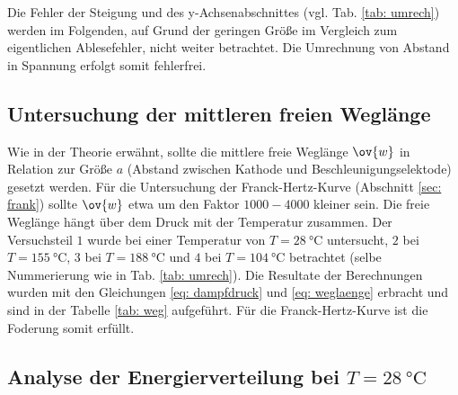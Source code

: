 Die Fehler der Steigung und des y-Achsenabschnittes (vgl. Tab. \ref{tab: umrech}) werden
im Folgenden, auf Grund der geringen Größe im Vergleich zum eigentlichen Ablesefehler, nicht weiter betrachtet.
Die Umrechnung von Abstand in Spannung erfolgt somit fehlerfrei.
\FloatBarrier

\subsection{Untersuchung der mittleren freien Weglänge}
\FloatBarrier
Wie in der Theorie erwähnt, sollte die mittlere freie Weglänge $\ov{w}$ in Relation zur Größe $a$
(Abstand zwischen Kathode und Beschleunigungselektode) gesetzt werden. Für die Untersuchung der Franck-Hertz-Kurve (Abschnitt \ref{sec: frank})
sollte $\ov{w}$ etwa um den Faktor $1000-4000$ kleiner sein. Die freie Weglänge hängt über dem Druck mit der Temperatur zusammen.
Der Versuchsteil $1$ wurde bei einer Temperatur von $T=\SI{28}{\celsius}$ untersucht, $2$ bei $T=\SI{155}{\celsius}$,
$3$ bei $T=\SI{188}{\celsius}$ und $4$ bei $T=\SI{104}{\celsius}$ betrachtet (selbe Nummerierung wie in Tab. \ref{tab: umrech}).
Die Resultate der Berechnungen wurden mit den Gleichungen \eqref{eq: dampfdruck} und \eqref{eq: weglaenge} erbracht und
sind in der Tabelle \ref{tab: weg} aufgeführt.
Für die Franck-Hertz-Kurve ist die Foderung somit erfüllt.



\subsection{Analyse der Energierverteilung bei $T=\SI{28}{\celsius}$}

